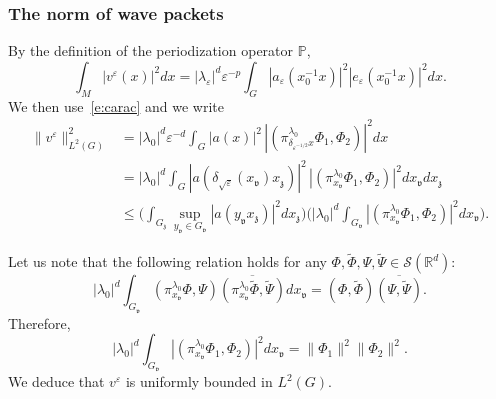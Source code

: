 \documentclass[JEP,XML,SOM,Unicode,published]{cedram}
\let\mathcal\mathscr
\theoremstyle{plain}
\theoremstyle{definition}
\let\eps\varepsilon
\def\R{{\mathbb R}}
\def\bbP{{\mathbb P}}
\begin{document}
\subsubsection{The norm of wave packets} \label{s:norm}
By the definition of the periodization operator $\bbP$,
\[
\int_M | v^\eps(x)|^2 dx= |\lambda_\eps|^{d} \eps^{-p}\int_{G} |a_\eps(x_0^{-1}x)|^2 |e_\eps(x_0^{-1}x) |^2dx.
\]
We then use~\eqref{e:carac} and we write
\begin{align*}
\| v^\eps\|^2_{L^2(G)}&= |\lambda_0|^d \eps^{-d}
\int_G |a(x)|^2\, |(\pi^{\lambda_0}_{\delta_{\eps^{-1/2}} x} \Phi_1,\Phi_2)|^2 dx\\
&= |\lambda_0|^d \int_G |a(\delta_{\sqrt\eps} (x_{\mathfrak v}) x_{\mathfrak z})|^2\, |(\pi^{\lambda_0}_{x_{\mathfrak v} }\Phi_1,\Phi_2)|^2 dx_{\mathfrak v} dx_{\mathfrak z}\\
&\leq\biggl(\int_{G_{\mathfrak z} } \sup_{y_{\mathfrak v} \in G_{\mathfrak v}} |a (y_{\mathfrak v} x_{\mathfrak z})|^2 dx_{\mathfrak z} \biggr)
\biggl(|\lambda_0|^d \int_{G_{\mathfrak v}}|(\pi^{\lambda_0}_{x_{\mathfrak v}} \Phi_1, \Phi_2)|^2 dx_{\mathfrak v}\biggr).
\end{align*}

Let us note that the following relation holds for any $\Phi, \widetilde{\Phi},\Psi,\widetilde{\Psi}\in \mathcal S(\R^d)$:
\begin{equation} \label{e:intPhi}
|\lambda_0|^d \int_{G_{\mathfrak{v}}} (\pi_{x_{\mathfrak v}}^{\lambda_0}\Phi,\Psi)\overline{ (\pi_{x_{\mathfrak v}}^{\lambda_0}\widetilde{\Phi},\widetilde{\Psi})}dx_{\mathfrak v} = (\Phi,\widetilde{\Phi})\overline{(\Psi,\widetilde{\Psi})}.
\end{equation}
Therefore,
\[
|\lambda_0|^d \int_{G_{\mathfrak v}}|(\pi^{\lambda_0}_{x_{\mathfrak v}} \Phi_1, \Phi_2)|^2 dx_{\mathfrak v}=\| \Phi_1\|^2 \| \Phi_2\|^2.
\]
We deduce that $v^\eps$ is uniformly bounded in $L^2(G)$.
\end{document}
